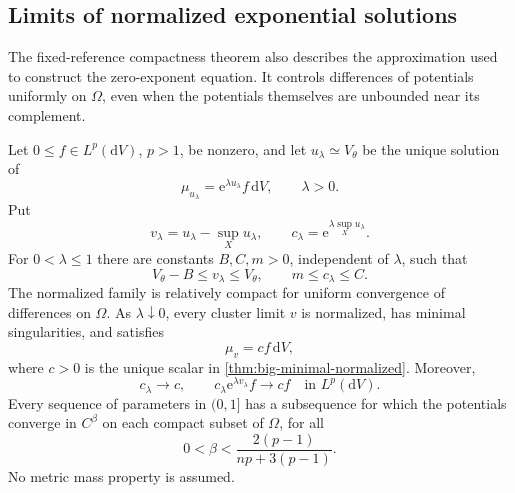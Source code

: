 \subsection{Limits of normalized exponential solutions}

The fixed-reference compactness theorem also describes the approximation
used to construct the zero-exponent equation. It controls differences of
potentials uniformly on $\Omega$, even when the potentials themselves
are unbounded near its complement.

\begin{proposition}\label{prop:big-exponential-clusters}
Let $0\leq f\in L^p(\mathrm{d}V)$, $p>1$, be nonzero, and let
$u_\lambda\simeq V_\theta$ be the unique solution of
\[
 \mu_{u_\lambda}=\mathrm{e}^{\lambda u_\lambda}f\,\mathrm{d}V,
 \qquad \lambda>0.
\]
Put
\[
 v_\lambda=u_\lambda-\sup_Xu_\lambda,
 \qquad c_\lambda=\mathrm{e}^{\lambda\sup_Xu_\lambda}.
\]
For $0<\lambda\leq1$ there are constants $B,C,m>0$, independent of
$\lambda$, such that
\[
 V_\theta-B\leq v_\lambda\leq V_\theta,
 \qquad m\leq c_\lambda\leq C.
\]
The normalized family is relatively compact for uniform convergence of
differences on $\Omega$. As $\lambda\downarrow0$, every cluster limit
$v$ is normalized, has minimal singularities, and satisfies
\[
 \mu_v=cf\,\mathrm{d}V,
\]
where $c>0$ is the unique scalar in
\cref{thm:big-minimal-normalized}. Moreover,
\[
 c_\lambda\longrightarrow c,
 \qquad c_\lambda\mathrm{e}^{\lambda v_\lambda}f
          \longrightarrow cf\quad\text{in }L^p(\mathrm{d}V).
\]
Every sequence of parameters in $(0,1]$ has a subsequence for which the
potentials converge in $C^\beta$ on each compact subset of $\Omega$, for
all
\[
 0<\beta<\frac{2(p-1)}{np+3(p-1)}.
\]
No metric mass property is assumed.
\end{proposition}

